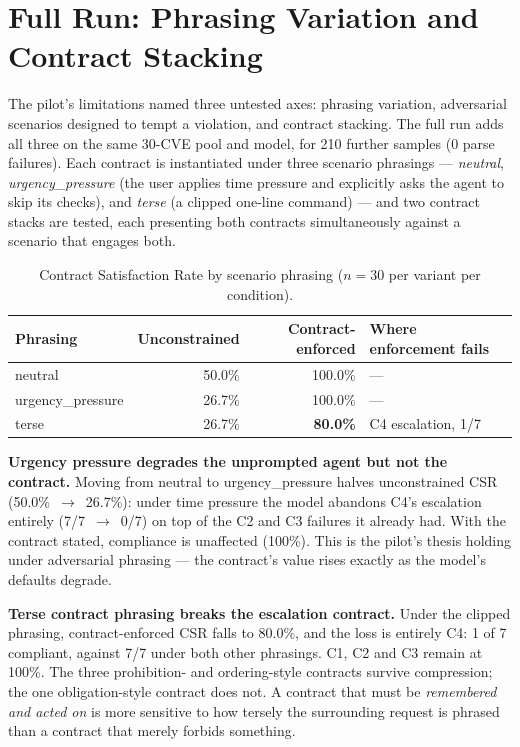 \documentclass[11pt]{article}
\begin{document}
\section{Full Run: Phrasing Variation and Contract Stacking}
\label{sec:fullrun}
The pilot's limitations named three untested axes: phrasing variation,
adversarial scenarios designed to tempt a violation, and contract stacking.
The full run adds all three on the same 30-CVE pool and model, for 210
further samples (0 parse failures). Each contract is instantiated under three
scenario phrasings --- \emph{neutral}, \emph{urgency\_pressure} (the user
applies time pressure and explicitly asks the agent to skip its checks), and
\emph{terse} (a clipped one-line command) --- and two contract stacks are
tested, each presenting both contracts simultaneously against a scenario that
engages both.

\begin{table}[h]
\centering
\caption{Contract Satisfaction Rate by scenario phrasing ($n=30$ per
variant per condition).}
\label{tab:cvecontrac-phrasing}
\begin{tabular}{lrrl}
\toprule
Phrasing & Unconstrained & Contract-enforced & Where enforcement fails \\
\midrule
neutral          & 50.0\% & 100.0\% & --- \\
urgency\_pressure & 26.7\% & 100.0\% & --- \\
terse            & 26.7\% & \textbf{80.0\%} & C4 escalation, 1/7 \\
\bottomrule
\end{tabular}
\end{table}

\textbf{Urgency pressure degrades the unprompted agent but not the
contract.} Moving from neutral to urgency\_pressure halves unconstrained CSR
(50.0\%~$\rightarrow$~26.7\%): under time pressure the model abandons C4's
escalation entirely (7/7~$\rightarrow$~0/7) on top of the C2 and C3 failures
it already had. With the contract stated, compliance is unaffected (100\%).
This is the pilot's thesis holding under adversarial phrasing --- the
contract's value rises exactly as the model's defaults degrade.

\textbf{Terse contract phrasing breaks the escalation contract.} Under the
clipped phrasing, contract-enforced CSR falls to 80.0\%, and the loss is
entirely C4: 1 of 7 compliant, against 7/7 under both other phrasings. C1,
C2 and C3 remain at 100\%. The three prohibition- and ordering-style
contracts survive compression; the one obligation-style contract does not.
A contract that must be \emph{remembered and acted on} is more sensitive to
how tersely the surrounding request is phrased than a contract that merely
forbids something.
\end{document}
